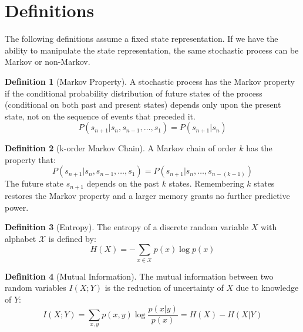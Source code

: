 \documentclass{article} %
\title{}
\author{}
\theoremstyle{definition}
\newtheorem{definition}{Definition}[section]
\begin{document}
\maketitle

\begin{abstract}
We seek to contribute:\\
1) A clear understanding of Partial Observability as it relates to
state, agent, and task.\\
2) A measure of the degree to which a domain is partially observable.\\
3) A way to quantify the deficiency of a given state representation.\\
\end{abstract}

\section{Definitions}
The following definitions assume a fixed state representation. If we
have the ability to manipulate the state representation, the same
stochastic process can be Markov or non-Markov.

\begin{definition}[Markov Property]
A stochastic process has the Markov property if the conditional
probability distribution of future states of the process (conditional
on both past and present states) depends only upon the present state,
not on the sequence of events that preceded it.
\[
P(s_{n+1} | s_{n}, s_{n-1}, \dots, s_{1}) = P(s_{n+1} | s_{n})
\]
\end{definition}

\begin{definition}[k-order Markov Chain]
A Markov chain of order $k$ has the property that:
\[
P(s_{n+1} | s_{n}, s_{n-1}, \dots, s_{1}) = P(s_{n+1} | s_{n}, \dots, s_{n-(k-1)})
\]
The future state $s_{n+1}$ depends on the past $k$ states. Remembering
$k$ states restores the Markov property and a larger memory grants no
further predictive power.
\end{definition}

\begin{definition}[Entropy]
\label{def:entropy}
The entropy of a discrete random variable $X$ with alphabet $\mathcal{X}$ is
defined by:
\[
H(X) = -\sum_{x\in \mathcal{X}} p(x) \log p(x)
\]
\end{definition}

\begin{definition}[Mutual Information]
The mutual information between two random variables $I(X;Y)$ is the
reduction of uncertainty of $X$ due to knowledge of $Y$:
\[
I(X;Y) = \sum_{x,y} p(x,y) \log \frac{p(x|y)}{p(x)} = H(X) - H(X|Y)
\]
\end{definition}
\end{document}
